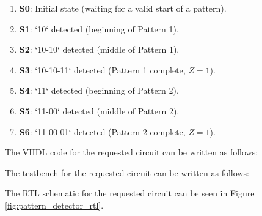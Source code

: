 \documentclass[table ]{article}
\begin{document}
\begin{enumerate}
    \item \textbf{S0}: Initial state (waiting for a valid start of a pattern).
    \item \textbf{S1}: `10` detected (beginning of Pattern 1).
    \item \textbf{S2}: `10-10` detected (middle of Pattern 1).
    \item \textbf{S3}: `10-10-11` detected (Pattern 1 complete, \(Z = 1\)).
    \item \textbf{S4}: `11` detected (beginning of Pattern 2).
    \item \textbf{S5}: `11-00` detected (middle of Pattern 2).
    \item \textbf{S6}: `11-00-01` detected (Pattern 2 complete, \(Z = 1\)).
\end{enumerate}


The VHDL code for the requested circuit can be written as follows:


\begin{center} %
    \lstset{
  caption= Pattern\_Detector.vhd, 
  basicstyle=\footnotesize, frame=tb,
  xleftmargin=.2\textwidth, xrightmargin=.2\textwidth
}
    

\end{center}

The testbench for the requested circuit can be written as follows:



\begin{center} %
    \lstset{
  caption= Pattern\_Detector\_tb.vhd, 
  basicstyle=\footnotesize, frame=tb,
  xleftmargin=.2\textwidth, xrightmargin=.2\textwidth
}
    

\end{center}


The RTL schematic for the requested circuit can be seen in Figure \ref{fig:pattern_detector_rtl}.
\end{document}
